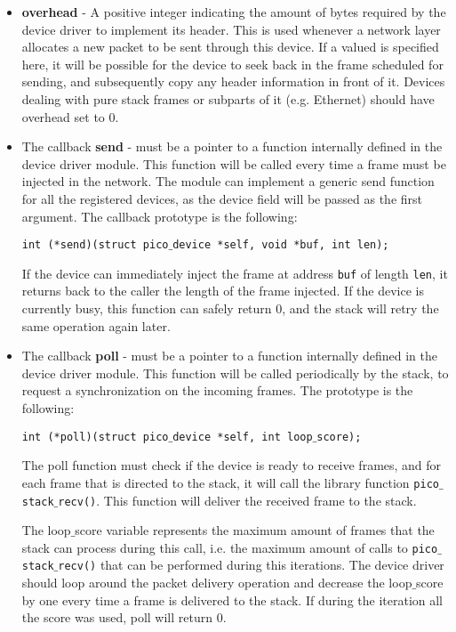 \begin{itemize}
\item \textbf{overhead} - A positive integer indicating the amount of bytes required by the
device driver to implement its header. This is used whenever a network layer allocates a new
packet to be sent through this device. If a valued is specified here, it will be possible for
the device to seek back in the frame scheduled for sending, and subsequently copy any header
information in front of it. Devices dealing with pure stack frames or subparts of it
(e.g. Ethernet) should have overhead set to 0.

\item The callback \textbf{send} - must be a pointer to a function internally defined in the
device driver module. This function will be called every time a frame must be injected in the
network. The module can implement a generic send function for all the registered devices, as
the device field will be passed as the first argument. The callback prototype is the following:

 \texttt{int (*send)(struct pico$\_$device *self, void *buf, int len);}

If the device can immediately inject the frame at address \texttt{buf} of length \texttt{len},
it returns back to the caller the length of the frame injected. If the device is currently busy,
this function can safely return 0, and the stack will retry the same operation again later.

\item The callback \textbf{poll} - must be a pointer to a function internally defined in the
device driver module. This function will be called periodically by the stack, to request a
synchronization on the incoming frames. The prototype is the following:

  \texttt{int (*poll)(struct pico$\_$device *self, int loop$\_$score);}

The poll function must check if the device is ready to receive frames, and for each frame that
is directed to the stack, it will call the library function \texttt{pico$\_$stack$\_$recv()}.
This function will deliver the received frame to the stack.

The loop$\_$score variable represents the maximum amount of frames that the stack can process
during this call, i.e. the maximum amount of calls to \texttt{pico$\_$stack$\_$recv()} that
can be performed during this iterations. The device driver should loop around the packet
delivery operation and decrease the loop$\_$score by one every time a frame is delivered to
the stack. If during the iteration all the score was used, poll will return 0.


\end{itemize}
